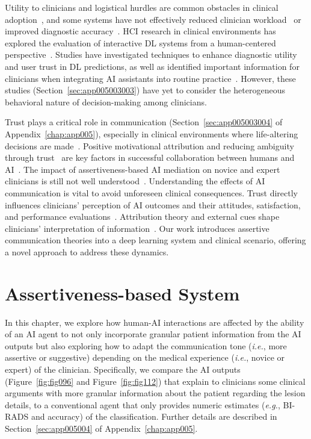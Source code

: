 Utility to clinicians and logistical hurdles are common obstacles in clinical adoption~\cite{CALISTO2022102922}, and some systems have not effectively reduced clinician workload~\cite{KOHLI2018535} or improved diagnostic accuracy~\cite{KOHLI2018535}.
\ac{HCI} research in clinical environments has explored the evaluation of interactive \ac{DL} systems from a human-centered perspective~\cite{10.1145/3311957.3359433, 10.1145/3359206, 10.1145/3538882.3542790}.
Studies have investigated techniques to enhance diagnostic utility and user trust in \ac{DL} predictions, as well as identified important information for clinicians when integrating \ac{AI} assistants into routine practice~\cite{10.1145/3290605.3300234, 10.1145/3359206}.
However, these studies (Section~\ref{sec:app005003003}) have yet to consider the heterogeneous behavioral nature of decision-making among clinicians.

Trust plays a critical role in communication (Section~\ref{sec:app005003004} of Appendix~\ref{chap:app005}), especially in clinical environments where life-altering decisions are made~\cite{CALISTO2022102922}.
Positive motivational attribution and reducing ambiguity through trust~\cite{HOHENSTEIN2020106190} are key factors in successful collaboration between humans and \ac{AI}~\cite{10.1145/3479587, 10.1145/3334480.3375147, 10.1145/3334480.3382842}.
The impact of assertiveness-based \ac{AI} mediation on novice and expert clinicians is still not well understood~\cite{Lundberg2020}.
Understanding the effects of \ac{AI} communication is vital to avoid unforeseen clinical consequences.
Trust directly influences clinicians' perception of \ac{AI} outcomes and their attitudes, satisfaction, and performance evaluations~\cite{10.1145/3491102.3502104}.
Attribution theory and external cues shape clinicians' interpretation of information~\cite{10.1145/3544548.3580682}.
Our work introduces assertive communication theories into a deep learning system and clinical scenario, offering a novel approach to address these dynamics.

\section{Assertiveness-based System}
\label{sec:chap006003}

In this chapter, we explore how human-\ac{AI} interactions are affected by the ability of an \ac{AI} agent to not only incorporate granular patient information from the \ac{AI} outputs but also exploring how to adapt the communication tone ({\it i.e.}, more assertive or suggestive) depending on the medical experience ({\it i.e.}, novice or expert) of the clinician.
Specifically, we compare the \ac{AI} outputs (Figure~\ref{fig:fig096} and Figure~\ref{fig:fig112}) that explain to clinicians some clinical arguments with more granular information about the patient regarding the lesion details, to a conventional agent that only provides numeric estimates ({\it e.g.}, \ac{BI-RADS} and accuracy) of the classification.
Further details are described in Section~\ref{sec:app005004} of Appendix~\ref{chap:app005}.

